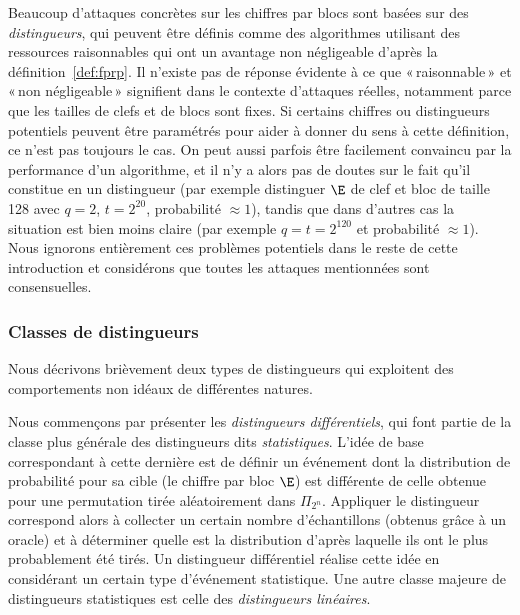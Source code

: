 Beaucoup d'attaques concrètes sur les chiffres par blocs sont basées sur des \emph{distingueurs}, qui peuvent être définis comme des algorithmes utilisant des ressources
raisonnables qui ont un avantage non négligeable d'après la définition~\ref{def:fprp}.
Il n'existe pas de réponse évidente à ce que «\,raisonnable\,» et «\,non négligeable\,» signifient dans le contexte d'attaques réelles, notamment parce que les tailles de clefs
et de blocs sont fixes. Si certains chiffres ou distingueurs potentiels peuvent être paramétrés pour aider à donner du sens à cette définition, ce n'est pas toujours le cas.
On peut aussi parfois être facilement convaincu par la performance d'un algorithme, et il n'y a alors pas de doutes sur le fait qu'il constitue en un distingueur
(par exemple distinguer $\E$ de clef et bloc de taille 128 avec $q = 2$, $t = 2^{20}$, probabilité $\approx 1$), tandis que dans d'autres cas la situation est bien
moins claire (par exemple $q = t = 2^{120}$ et probabilité $\approx 1$). Nous ignorons entièrement ces problèmes potentiels dans le reste de cette introduction et considérons
que toutes les attaques mentionnées sont consensuelles.

\subsubsection{Classes de distingueurs}

Nous décrivons brièvement deux types de distingueurs qui exploitent des comportements non idéaux de différentes natures.

\bigskip

Nous commençons par présenter les \emph{distingueurs différentiels}, qui font partie de la classe plus générale des distingueurs
dits \emph{statistiques}.
L'idée de base correspondant à cette dernière est de définir un événement dont la distribution de probabilité pour sa cible
(le chiffre par bloc $\E$) est différente de celle obtenue pour une permutation tirée aléatoirement dans $\Pi_{2^n}$.
Appliquer le distingueur correspond alors à collecter un certain nombre d'échantillons (obtenus grâce à un oracle)
et à déterminer quelle est la distribution d'après laquelle ils ont le plus probablement été tirés.
Un distingueur différentiel réalise cette idée en considérant un certain type d'événement statistique. Une autre classe
majeure de distingueurs statistiques est celle des \emph{distingueurs linéaires}.

